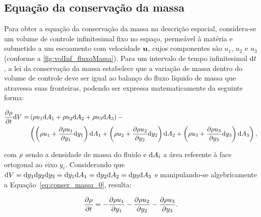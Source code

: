 \subsection{Equação da conservação da massa}

Para obter a equação da conservação da massa na descrição espacial, considera-se um volume de controle infinitesimal fixo no espaço, permeável à matéria e submetido a um escoamento com velocidade $\mathbf{u}$, cujos componentes são $u_1$, $u_2$ e $u_3$ (conforme a \autoref{fig:volInf_fluxoMassa}). Para um intervalo de tempo infinitesimal $\mathrm{d} t$, a lei da conservação da massa estabelece que a variação de massa dentro do volume de controle deve ser igual ao balanço do fluxo líquido de massa que atravessa suas fronteiras, podendo ser expressa matematicamente da seguinte forma:

\begin{align}
	\begin{split}
	\frac{\partial \rho}{\partial t}\mathrm{d} V =& \left(\rho u_1 \mathrm{d} A_{1}  +  \rho u_2 \mathrm{d} A_{2} + \rho u_3  \mathrm{d} A_{3} \right) - \\  &\left(\left(\rho u_1 + \frac{\partial \rho u_1}{\partial y_1}\mathrm{d} y_1 \right)\mathrm{d} A_{1} + \left(\rho u_2+ \frac{\partial \rho u_2}{\partial y_2}\mathrm{d} y_2 \right) \mathrm{d} A_{2} + \left(\rho u_3 + \frac{\partial \rho u_3}{\partial y_3}\mathrm{d} y_3 \right) \mathrm{d} A_{3}\right), \label{eq:conser_massa_0} 
	\end{split}
\end{align}

\noindent com $\rho$ sendo a densidade de massa do fluido e $\mathrm{d} A_{i}$ a área referente à face ortogonal ao eixo $y_i$. Considerando que $\mathrm{d} V = \mathrm{d} y_1 \mathrm{d} y_2 \mathrm{d} y_3 = \mathrm{d} y_1 \mathrm{d} A_1 = \mathrm{d} y_2 \mathrm{d} A_2 = \mathrm{d} y_3 \mathrm{d} A_3 $  e manipulando-se algebricamente a Equação~\eqref{eq:conser_massa_0}, resulta:

\begin{align}
	\frac{\partial \rho}{\partial t} = - \frac{\partial \rho u_{1}}{\partial y_1} - \frac{\partial \rho u_{2}}{\partial y_2}- \frac{\partial \rho u_{3}}{\partial y_3}.
\end{align}

